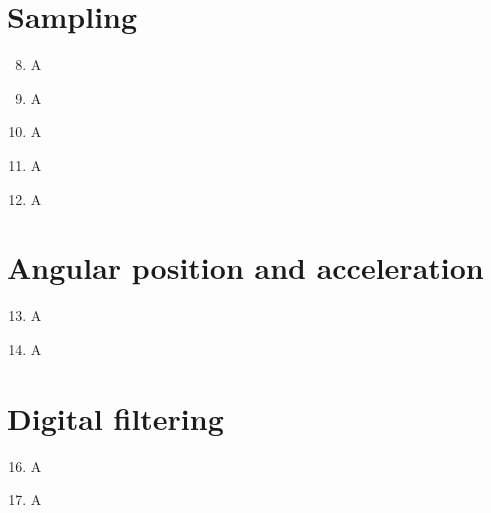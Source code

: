 \documentclass[a4paper,12pt]{article}
\begin{document}
\newpage
\section{Sampling}

\begin{enumerate}[label={\color{blue}\arabic*)}]
    \setcounter{enumi}{7}

    \item 
    A
    
    \item 
    A

    \item 
    A

    \item 
    A

    \item 
    A

\end{enumerate}

\newpage
\section{Angular position and acceleration}

\begin{enumerate}[label={\color{blue}\arabic*)}]
    \setcounter{enumi}{12}

    \item 
    A
    
    \item 
    A

\end{enumerate}

\newpage
\section{Digital filtering}

\begin{enumerate}[label={\color{blue}\arabic*)}]
    \setcounter{enumi}{15}

    \item 
    A
    
    \item 
    A

\end{enumerate}
\end{document}
